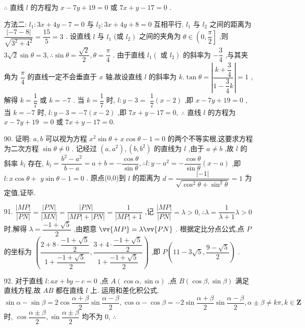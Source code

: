 $\therefore$ 直线 $l$ 的方程为 $x - {7y} + {19} = 0$ 或 ${7x} + y - {17} = 0$ .

方法二: ${l}_{1} : {3x} + {4y} - 7 = 0$ 与 ${l}_{2} : {3x} + {4y} + 8 = 0$ 互相平行. ${l}_{1}$ 与 ${l}_{2}$ 之间的距离为 $\dfrac{\left| -7 - 8\right| }{\sqrt{{3}^{2} + {4}^{2}}} = \dfrac{15}{5} = 3$ . 设直线 $l$ 与 ${l}_{1}$ (或 $\left. {l}_{2}\right)$ 之间的夹角为 $\theta  \in  \left( {0,\dfrac{\pi }{2}}\right\rbrack$ ,则 $3\sqrt{2}\sin \theta  = 3,\therefore \sin \theta  = \dfrac{\sqrt{2}}{2},\theta  = \dfrac{\pi }{4}$ . 由于直线 ${l}_{1}\left( {\text{ 或 }{l}_{2}}\right)$ 的斜率为 $- \dfrac{3}{4}$ ,与其夹角为 $\dfrac{\pi }{4}$ 的直线一定不会垂直于 $x$ 轴,故设直线 $l$ 的斜率为 $k.\tan \theta  = \left| \dfrac{k + \dfrac{3}{4}}{1 - \dfrac{3}{4}k}\right|  = 1$ ,解得 $k = \dfrac{1}{7}$ 或 $k =  - 7$ . 当 $k = \dfrac{1}{7}$ 时, $l : y - 3 =$  $\dfrac{1}{7}\left( {x - 2}\right)$ ,即 $x - {7y} + {19} = 0$ ,当 $k =  - 7$ 时, $l : y - 3 =  - 7\left( {x - 2}\right)$ ,即 ${7x} + y - {17} = 0,\;\therefore$ 直线 $l$ 的方程为 $x - {7y} + {19}$  $= 0$ 或 ${7x} + y - {17} = 0.$

90. 证明: $a,b$ 可以视为方程 ${x}^{2}\sin \theta  + x\cos \theta  - 1 = 0$ 的两个不等实根,这要求方程为二次方程 $\sin \theta  \neq  0$ . 记经过 $\left( {a,{a}^{2}}\right) ,\left( {b,{b}^{2}}\right)$ 的直线为 $l$ ,由于 $a \neq  b$ ,故 $l$ 的斜率 ${k}_{l}$ 存在, ${k}_{l} = \dfrac{{b}^{2} - {a}^{2}}{b - a} = a + b =  - \dfrac{\cos \theta }{\sin \theta },\therefore l : y - {a}^{2} =  - \dfrac{\cos \theta }{\sin \theta }\left( {x - a}\right)$ ,即 $l : x\cos \theta  +$  $y\sin \theta  - 1 = 0$ . 原点(0,0)到 $l$ 的距离为 $d = \dfrac{\left| -1\right| }{\sqrt{{\cos }^{2}\theta  + {\sin }^{2}\theta }} = 1$ 为定值,证毕.

91. $\dfrac{\left| MP\right| }{\left| PN\right| } = \dfrac{\left| PN\right| }{\left| MN\right| } = \dfrac{\left| PN\right| }{\left| {MP}\right|  + \left| {PN}\right| } = \dfrac{1}{\left| {MP}\right|  + 1}$ ,记 $\dfrac{\left| MP\right| }{\left| PN\right| } = \lambda  > 0,\therefore \lambda  = \dfrac{1}{\lambda  + 1}\lambda  > 0$ 时,解得 $\lambda  = \dfrac{-1 + \sqrt{5}}{2}$ ,由题意 $\vv{MP} = \lambda \vv{PN}$ . 根据定比分点公式,点 $P$ 的坐标为 $\left( {\dfrac{2 + 8 \cdot  \dfrac{-1 + \sqrt{5}}{2}}{1 + \dfrac{-1 + \sqrt{5}}{2}},\dfrac{3 + 4 \cdot  \dfrac{-1 + \sqrt{5}}{2}}{1 + \dfrac{-1 + \sqrt{5}}{2}}}\right)$ ,即 $P\left( {{11} - 3\sqrt{5},\dfrac{9 - \sqrt{5}}{2}}\right)$ .

92. 对于直线 $l : {ax} + {by} - c = 0$ ,点 $A\left( {\cos \alpha ,\sin \alpha }\right)$ ,点 $B\left( {\cos \beta ,\sin \beta }\right)$ 满足直线方程,故 ${AB}$ 都在直线 $l$ 上. 运用和差化积公式, $\sin \alpha  - \sin \beta  = 2\cos \dfrac{\alpha  + \beta }{2}\sin \dfrac{\alpha  - \beta }{2},\cos \alpha  - \cos \beta  =  - 2\sin \dfrac{\alpha  + \beta }{2}\sin \dfrac{\alpha  - \beta }{2},\alpha  \pm  \beta  \neq  {k\pi },k \in  \mathbf{Z}$ 时, $\cos \dfrac{\alpha  \pm  \beta }{2},\sin \dfrac{\alpha  \pm  \beta }{2}$ 均不为 0, $\therefore$

